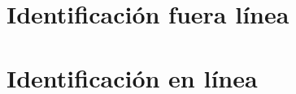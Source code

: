\section{Identificación fuera línea}\label{sec:PMR_outline}
        
\section{Identificación en línea}\label{sec:PMR_online}